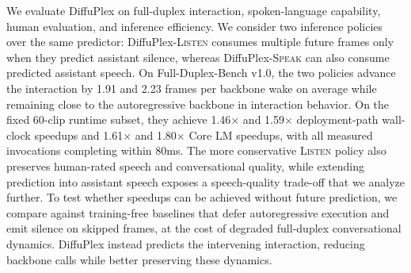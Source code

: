 We evaluate DiffuPlex on full-duplex interaction, spoken-language capability, human evaluation, and inference efficiency.
We consider two inference policies over the same predictor: DiffuPlex-\textsc{Listen} consumes multiple future frames only when they predict assistant silence, whereas DiffuPlex-\textsc{Speak} can also consume predicted assistant speech.
On Full-Duplex-Bench v1.0, the two policies advance the interaction by 1.91 and 2.23 frames per backbone wake on average while remaining close to the autoregressive backbone in interaction behavior.
On the fixed 60-clip runtime subset, they achieve 1.46$\times$ and 1.59$\times$ deployment-path wall-clock speedups and 1.61$\times$ and 1.80$\times$ Core LM speedups, with all measured invocations completing within 80ms.
The more conservative \textsc{Listen} policy also preserves human-rated speech and conversational quality, while extending prediction into assistant speech exposes a speech-quality trade-off that we analyze further.
To test whether speedups can be achieved without future prediction, we compare against training-free baselines that defer autoregressive execution and emit silence on skipped frames, at the cost of degraded full-duplex conversational dynamics.
DiffuPlex instead predicts the intervening interaction, reducing backbone calls while better preserving these dynamics.